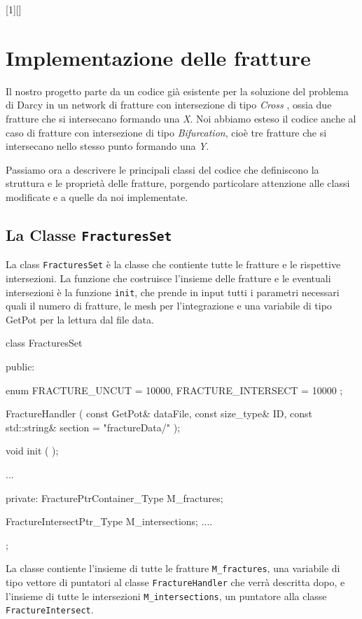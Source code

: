 [1][]{}{}

\chapter{Implementazione delle fratture}

Il nostro progetto parte da un codice già esistente per la soluzione del problema di Darcy in un network di fratture con intersezione di tipo \textit{Cross }, ossia due fratture che si intersecano formando una \textit{X}. Noi abbiamo esteso il codice anche al caso di fratture con intersezione di tipo \textit{Bifurcation}, cioè tre fratture che si intersecano nello stesso punto formando una \textit{Y}.

Passiamo ora a descrivere le principali classi del codice che definiscono la struttura e le proprietà delle fratture, porgendo particolare attenzione alle classi modificate e a quelle da noi implementate.

\section{La Classe \texttt{FracturesSet}}
La class \texttt{FracturesSet} è la classe che contiente tutte le fratture e le rispettive intersezioni. La funzione che costruisce l'insieme delle fratture e le eventuali intersezioni è la funzione  \texttt{init}, che prende in input tutti i parametri necessari quali il numero di fratture, le mesh per l'integrazione e una variabile di tipo GetPot per la lettura dal file data. 

\begin{Code}[caption={Classe \texttt{FracturesSet}}]
class FracturesSet
{
public:

    enum
    {
        FRACTURE_UNCUT = 10000,
        FRACTURE_INTERSECT = 10000
    };

    FractureHandler ( const GetPot& dataFile,
                      const size_type& ID,
                      const std::string& section = "fractureData/" );

    void init ( );

    ...

private:
	FracturePtrContainer_Type M_fractures;

	FractureIntersectPtr_Type M_intersections;
	....
};
\end{Code}
La classe contiente l'insieme di tutte le fratture \texttt{M\_fractures}, una variabile di tipo vettore di puntatori al classe \texttt{FractureHandler} che verrà descritta dopo, e l'insieme di tutte le intersezioni \texttt{M\_intersections}, un puntatore alla classe \texttt{FractureIntersect}. 


